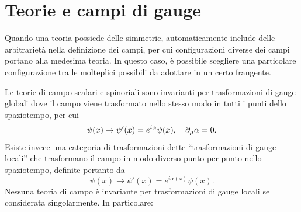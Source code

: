 \section{Teorie e campi di gauge}
Quando una teoria possiede delle simmetrie, automaticamente include delle arbitrarietà nella definizione dei campi, per cui configurazioni diverse dei campi portano alla medesima teoria. In questo caso, è possibile scegliere una particolare configurazione tra le molteplici possibili da adottare in un certo frangente. 
\begin{center}
\end{center}
Le teorie di campo scalari e spinoriali sono invarianti per trasformazioni di gauge globali dove il campo viene trasformato nello stesso modo in tutti i punti dello spaziotempo, per cui
\begin{equation}
\label{eq: trasformazione gauge globale}
    \psi(x) \to \psi'(x) = e^{i\alpha}\psi(x),\quad \partial_\mu\alpha = 0.
\end{equation}
Esiste invece una categoria di trasformazioni dette ``trasformazioni di gauge locali'' che trasformano il campo in modo diverso punto per punto nello spaziotempo, definite pertanto da
\begin{equation}
\label{eq: trasformazione gauge locale}
    \psi(x) \to \psi'(x) = e^{i\alpha(x)}\psi(x).
\end{equation}
Nessuna teoria di campo è invariante per trasformazioni di gauge locali se considerata singolarmente. In particolare:
